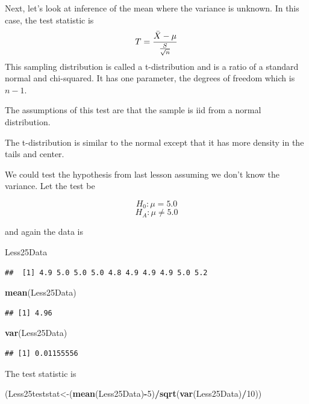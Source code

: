 \documentclass[]{book}
\newenvironment{Shaded}{\begin{snugshade}}{\end{snugshade}}
\newcommand{\KeywordTok}[1]{\textcolor[rgb]{0.13,0.29,0.53}{\textbf{#1}}}
\newcommand{\DecValTok}[1]{\textcolor[rgb]{0.00,0.00,0.81}{#1}}
\newcommand{\OperatorTok}[1]{\textcolor[rgb]{0.81,0.36,0.00}{\textbf{#1}}}
\newcommand{\NormalTok}[1]{#1}
\theoremstyle{definition}
\theoremstyle{definition}
\theoremstyle{definition}
\theoremstyle{remark}
\begin{document}
Next, let's look at inference of the mean where the variance is unknown.
In this case, the test statistic is
\[T= {\bar{X} - \mu \over {S \over \sqrt{n}}}\] This sampling
distribution is called a t-distribution and is a ratio of a standard
normal and chi-squared. It has one parameter, the degrees of freedom
which is \(n-1\).

The assumptions of this test are that the sample is iid from a normal
distribution.

The t-distribution is similar to the normal except that it has more
density in the tails and center.

We could test the hypothesis from last lesson assuming we don't know the
variance. Let the test be

\[H_{0}: \mu = 5.0\] \[H_{A}: \mu \neq 5.0\]

and again the data is

\begin{Shaded}
\begin{Highlighting}[]
\NormalTok{Less25Data}
\end{Highlighting}
\end{Shaded}

\begin{verbatim}
##  [1] 4.9 5.0 5.0 5.0 4.8 4.9 4.9 4.9 5.0 5.2
\end{verbatim}

\begin{Shaded}
\begin{Highlighting}[]
\KeywordTok{mean}\NormalTok{(Less25Data)}
\end{Highlighting}
\end{Shaded}

\begin{verbatim}
## [1] 4.96
\end{verbatim}

\begin{Shaded}
\begin{Highlighting}[]
\KeywordTok{var}\NormalTok{(Less25Data)}
\end{Highlighting}
\end{Shaded}

\begin{verbatim}
## [1] 0.01155556
\end{verbatim}

The test statistic is

\begin{Shaded}
\begin{Highlighting}[]
\NormalTok{(Less25teststat<-(}\KeywordTok{mean}\NormalTok{(Less25Data)}\OperatorTok{-}\DecValTok{5}\NormalTok{)}\OperatorTok{/}\KeywordTok{sqrt}\NormalTok{(}\KeywordTok{var}\NormalTok{(Less25Data)}\OperatorTok{/}\DecValTok{10}\NormalTok{))}
\end{Highlighting}
\end{Shaded}
\end{document}
